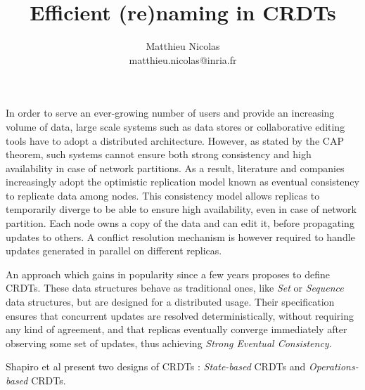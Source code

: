 \documentclass{article}
\title{Efficient (re)naming in \acp{CRDT}}
\author{Matthieu Nicolas \\ matthieu.nicolas@inria.fr}
\begin{document}
\maketitle
\thispagestyle{empty}


In order to serve an ever-growing number of users and provide an increasing volume of data,
large scale systems such as data stores\cite{Antidote} or collaborative editing tools\cite{nicolas:hal-01655438} have to adopt a distributed architecture.
However, as stated by the CAP theorem\cite{BrewerPoDC2000}, such systems cannot ensure both strong consistency and high availability in case of network partitions.
As a result, literature and companies increasingly adopt the optimistic replication model known as eventual consistency\cite{Terry:1995:MUC:224057.224070} to replicate data among nodes.
This consistency model allows replicas to temporarily diverge to be able to ensure high availability, even in case of network partition.
Each node owns a copy of the data and can edit it, before propagating updates to others.
A conflict resolution mechanism is however required to handle updates generated in parallel on different replicas.


An approach which gains in popularity since a few years proposes to define \acfp{CRDT}\cite{shapiro:inria-00555588}.
These data structures behave as traditional ones, like \emph{Set} or \emph{Sequence} data structures, but are designed for a distributed usage.
Their specification ensures that concurrent updates are resolved deterministically, without requiring any kind of agreement, and that replicas eventually converge immediately after observing some set of updates,
thus achieving \emph{Strong Eventual Consistency}\cite{ShapiroSSS2011}.

Shapiro et al\cite{shapiro:inria-00555588} present two designs of \acp{CRDT} :
\emph{State-based} \acp{CRDT} and \emph{Operations-based} \acp{CRDT}.
\end{document}
